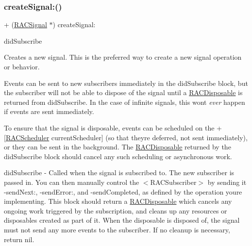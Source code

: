 \subsubsection{\texorpdfstring{create\+Signal\+:()}{createSignal:()}\hspace{0.1cm}{\footnotesize\ttfamily [2/3]}}
{\footnotesize\ttfamily + (\mbox{\hyperlink{interface_r_a_c_signal}{R\+A\+C\+Signal}} $\ast$) create\+Signal\+: \begin{DoxyParamCaption}\item[{(\mbox{\hyperlink{interface_r_a_c_disposable}{R\+A\+C\+Disposable}} $\ast$($^\wedge$)(id$<$\mbox{\hyperlink{interface_r_a_c_subscriber}{R\+A\+C\+Subscriber}}$>$ subscriber))}]{did\+Subscribe }\end{DoxyParamCaption}}

Creates a new signal. This is the preferred way to create a new signal operation or behavior.

Events can be sent to new subscribers immediately in the {\ttfamily did\+Subscribe} block, but the subscriber will not be able to dispose of the signal until a \mbox{\hyperlink{interface_r_a_c_disposable}{R\+A\+C\+Disposable}} is returned from {\ttfamily did\+Subscribe}. In the case of infinite signals, this won\textquotesingle{}t {\itshape ever} happen if events are sent immediately.

To ensure that the signal is disposable, events can be scheduled on the +\mbox{[}\mbox{\hyperlink{interface_r_a_c_scheduler}{R\+A\+C\+Scheduler}} current\+Scheduler\mbox{]} (so that they\textquotesingle{}re deferred, not sent immediately), or they can be sent in the background. The \mbox{\hyperlink{interface_r_a_c_disposable}{R\+A\+C\+Disposable}} returned by the {\ttfamily did\+Subscribe} block should cancel any such scheduling or asynchronous work.

did\+Subscribe -\/ Called when the signal is subscribed to. The new subscriber is passed in. You can then manually control the $<$\+R\+A\+C\+Subscriber$>$ by sending it -\/send\+Next\+:, -\/send\+Error\+:, and -\/send\+Completed, as defined by the operation you\textquotesingle{}re implementing. This block should return a \mbox{\hyperlink{interface_r_a_c_disposable}{R\+A\+C\+Disposable}} which cancels any ongoing work triggered by the subscription, and cleans up any resources or disposables created as part of it. When the disposable is disposed of, the signal must not send any more events to the {\ttfamily subscriber}. If no cleanup is necessary, return nil.

